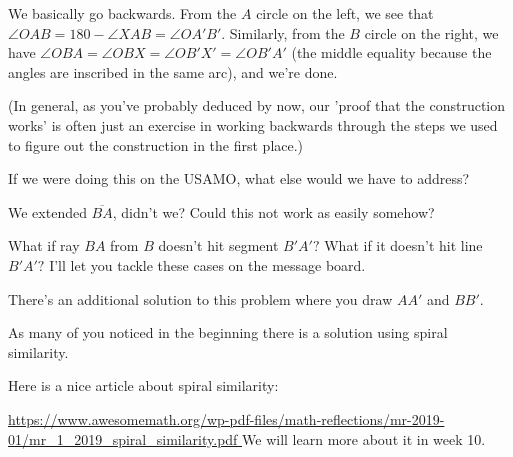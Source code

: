 We basically go backwards. From the $A$ circle on the left, we see that $\angle OAB = 180 - \angle XAB = \angle OA'B'.$ Similarly, from the $B$ circle on the right, we have $\angle OBA = \angle OBX = \angle OB'X' = \angle OB'A'$ (the middle equality because the angles are inscribed in the same arc), and we're done.

(In general, as you've probably deduced by now, our 'proof that the construction works' is often just an exercise in working backwards through the steps we used to figure out the construction in the first place.)

If we were doing this on the USAMO, what else would we have to address?

We extended $\overline{BA}$, didn't we? Could this not work as easily somehow?





What if ray $BA$ from $B$ doesn't hit segment $B'A'?$ What if it doesn't hit line $B'A'?$ I'll let you tackle these cases on the message board.

There's an additional solution to this problem where you draw $AA'$ and $BB'$.

\begin{remark}
    
As many of you noticed in the beginning there is a solution using spiral similarity.


Here is a nice article about spiral similarity:

\url{https://www.awesomemath.org/wp-pdf-files/math-reflections/mr-2019-01/mr_1_2019_spiral_similarity.pdf
}
We will learn more about it in week 10.
\end{remark}

